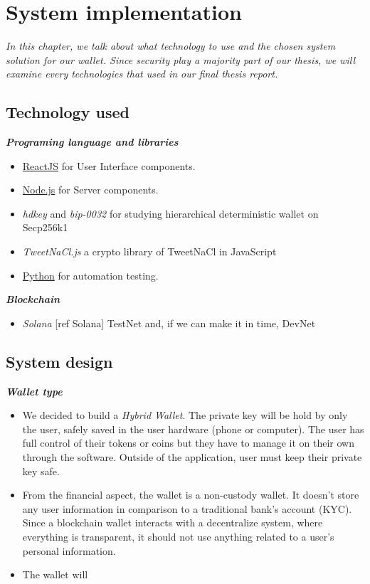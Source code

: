 \chapter{System implementation} \label{chap:System_implementation}
\textit{In this chapter, we talk about what technology to use and the chosen system solution for our wallet. Since security play a majority part of our thesis, we will examine every technologies that used in our final thesis report.}
\minitoc

\section{Technology used}
{\textit {\textbf{Programing language and libraries}}}
\begin{itemize}
\item \href{https://reactjs.org/}{ReactJS} for User Interface components. 
\item \href{https://nodejs.org/en/}{Node.js} for Server components.
\item \emph{hdkey} and \emph{bip-0032} for studying hierarchical deterministic wallet on Secp256k1
\item \emph{TweetNaCl.js} a crypto library of TweetNaCl in JavaScript
\item \href{https://www.python.org/}{Python} for automation testing.
\end{itemize}

{\textit {\textbf{Blockchain}}}
\begin{itemize}
    \item \emph{Solana} [ref Solana] TestNet and, if we can make it in time, DevNet
\end{itemize}

\section{System design}
{\textit {\textbf{Wallet type}}}
\begin{itemize}
    \item We decided to build a \emph{Hybrid Wallet}. The private key will be hold by only the user, safely saved in the user hardware (phone or computer). The user has full control of their tokens or coins but they have to manage it on their own through the software. Outside of the application, user must keep their private key safe.
    \item From the financial aspect, the wallet is a non-custody wallet. It doesn't store any user information in comparison to a traditional bank's account (KYC). Since a blockchain wallet interacts with a decentralize system, where everything is transparent, it should not use anything related to a user's personal information.
    \item The wallet will
\end{itemize}

